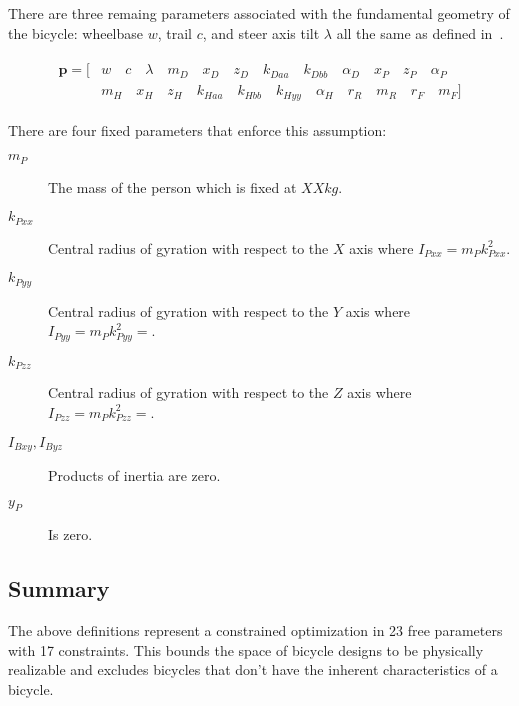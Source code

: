 \documentclass{bmd2019a}
\begin{document}
There are three remaing parameters associated with the fundamental geometry of
the bicycle: wheelbase $w$, trail $c$, and steer axis tilt $\lambda$ all the
same as defined in~\cite{Meijaard2007}.

\begin{align}
  \begin{split}
    \mathbf{p} = [ &
       w        \quad
       c        \quad
       \lambda  \quad
       m_D      \quad
       x_D      \quad
       z_D      \quad
       k_{Daa}  \quad
       k_{Dbb}  \quad
       \alpha_D \quad
       x_P      \quad
       z_P      \quad
       \alpha_P \\
     & m_H      \quad
       x_H      \quad
       z_H      \quad
       k_{Haa}  \quad
       k_{Hbb}  \quad
       k_{Hyy}  \quad
       \alpha_H \quad
       r_R      \quad
       m_R      \quad
       r_F      \quad
       m_F]
  \end{split}
\end{align}

There are four fixed parameters that enforce this assumption:

\begin{description}
  \item[$m_P$] The mass of the person which is fixed at $XX \si{kg}$.
  \item[$k_{Pxx}$] Central radius of gyration with respect to the $X$ axis
    where $I_{Pxx} = m_P k_{Pxx}^2$.
  \item[$k_{Pyy}$] Central radius of gyration with respect to the $Y$ axis
    where $I_{Pyy} = m_P k_{Pyy}^2=$.
  \item[$k_{Pzz}$] Central radius of gyration with respect to the $Z$ axis
    where $I_{Pzz} = m_P k_{Pzz}^2=$.
  \item[$I_{Bxy}, I_{Byz}$] Products of inertia are zero.
  \item[$y_P$] Is zero.
\end{description}
\subsection{Summary}

The above definitions represent a constrained optimization in 23 free
parameters with 17 constraints. This bounds the space of bicycle designs to be
physically realizable and excludes bicycles that don't have the inherent
characteristics of a bicycle.
\end{document}

